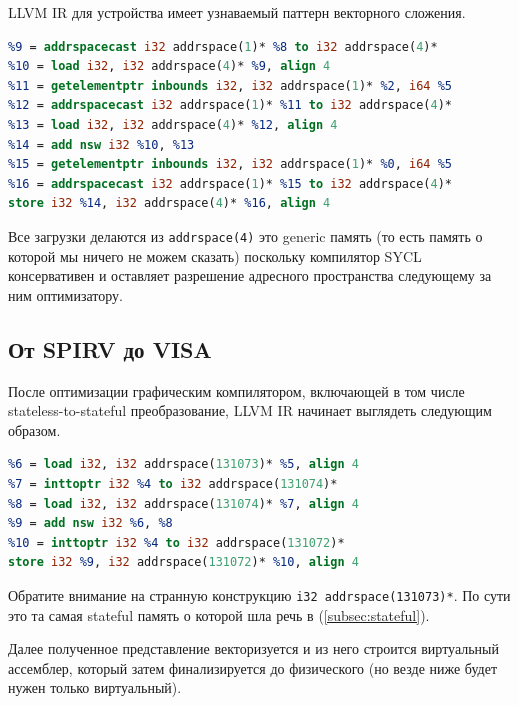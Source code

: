 \documentclass[a4paper,12pt,oneside]{article}
\begin{document}
LLVM IR для устройства имеет узнаваемый паттерн векторного сложения.

\begin{lstlisting}[language=llvm,caption={Сложение векторов: device IR после SYCL компилятора},label={lst:syclvaddllvm}]
%8 = getelementptr inbounds i32, i32 addrspace(1)* %1, i64 %5
%9 = addrspacecast i32 addrspace(1)* %8 to i32 addrspace(4)*
%10 = load i32, i32 addrspace(4)* %9, align 4
%11 = getelementptr inbounds i32, i32 addrspace(1)* %2, i64 %5
%12 = addrspacecast i32 addrspace(1)* %11 to i32 addrspace(4)*
%13 = load i32, i32 addrspace(4)* %12, align 4
%14 = add nsw i32 %10, %13
%15 = getelementptr inbounds i32, i32 addrspace(1)* %0, i64 %5
%16 = addrspacecast i32 addrspace(1)* %15 to i32 addrspace(4)*
store i32 %14, i32 addrspace(4)* %16, align 4
\end{lstlisting}

Все загрузки делаются из \lstinline!addrspace(4)! это generic память (то есть память о которой мы ничего не можем сказать) поскольку компилятор SYCL консервативен и оставляет разрешение адресного пространства следующему за ним оптимизатору.

\subsection{От SPIRV до VISA}\label{subsec:igc}

После оптимизации графическим компилятором, включающей в том числе stateless-to-stateful преобразование, LLVM IR начинает выглядеть следующим образом.

\begin{lstlisting}[language=llvm,caption={Сложение векторов: device IR после компилятора IGC},label={lst:syclvaddigc}]
%5 = inttoptr i32 %4 to i32 addrspace(131073)*
%6 = load i32, i32 addrspace(131073)* %5, align 4
%7 = inttoptr i32 %4 to i32 addrspace(131074)*
%8 = load i32, i32 addrspace(131074)* %7, align 4
%9 = add nsw i32 %6, %8
%10 = inttoptr i32 %4 to i32 addrspace(131072)*
store i32 %9, i32 addrspace(131072)* %10, align 4
\end{lstlisting}

Обратите внимание на странную конструкцию \lstinline!i32 addrspace(131073)*!. По сути это та самая stateful память о которой шла речь в (\ref{subsec:stateful}).

Далее полученное представление векторизуется и из него строится виртуальный ассемблер, который затем финализируется до физического (но везде ниже будет нужен только виртуальный).
\end{document}
